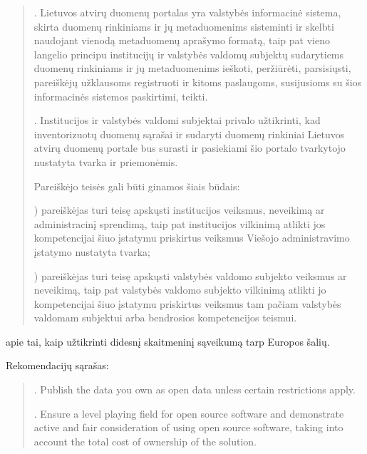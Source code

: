 \documentclass[letterpaper,10pt,lithuanian]{sphinxmanual}
\begin{document}
\begin{description}
\begin{quote}
. Lietuvos atvirų duomenų portalas yra valstybės informacinė
sistema, skirta duomenų rinkiniams ir jų metaduomenims sisteminti ir
skelbti naudojant vienodą metaduomenų aprašymo formatą, taip pat
vieno langelio principu institucijų ir valstybės valdomų subjektų
sudarytiems duomenų rinkiniams ir jų metaduomenims ieškoti,
peržiūrėti, parsisiųsti, pareiškėjų užklausoms registruoti ir kitoms
paslaugoms, susijusioms su šios informacinės sistemos paskirtimi,
teikti.

. Institucijos ir valstybės valdomi subjektai privalo užtikrinti,
kad inventorizuotų duomenų sąrašai ir sudaryti duomenų rinkiniai
Lietuvos atvirų duomenų portale bus surasti ir pasiekiami šio
portalo tvarkytojo nustatyta tvarka ir priemonėmis.

\sphinxAtStartPar
{}

\sphinxAtStartPar
Pareiškėjo teisės gali būti ginamos šiais būdais:

) pareiškėjas turi teisę apskųsti institucijos veiksmus, neveikimą
ar administracinį sprendimą, taip pat institucijos vilkinimą atlikti
jos kompetencijai šiuo įstatymu priskirtus veiksmus Viešojo
administravimo įstatymo nustatyta tvarka;

) pareiškėjas turi teisę apskųsti valstybės valdomo subjekto
veiksmus ar neveikimą, taip pat valstybės valdomo subjekto vilkinimą
atlikti jo kompetencijai šiuo įstatymu priskirtus veiksmus tam
pačiam valstybės valdomam subjektui arba bendrosios kompetencijos
teismui.
\end{quote}

\sphinxAtStartPar
{} apie tai, kaip užtikrinti didesnį skaitmeninį
sąveikumą tarp Europos šalių.

\sphinxAtStartPar
Rekomendacijų sąrašas:
\begin{quote}

. Publish the data you own as open data unless certain restrictions
apply.

. Ensure a level playing field for open source software and
demonstrate active and fair consideration of using open source
software, taking into account the total cost of ownership of the
solution.


\end{quote}
\end{description}
\end{document}
